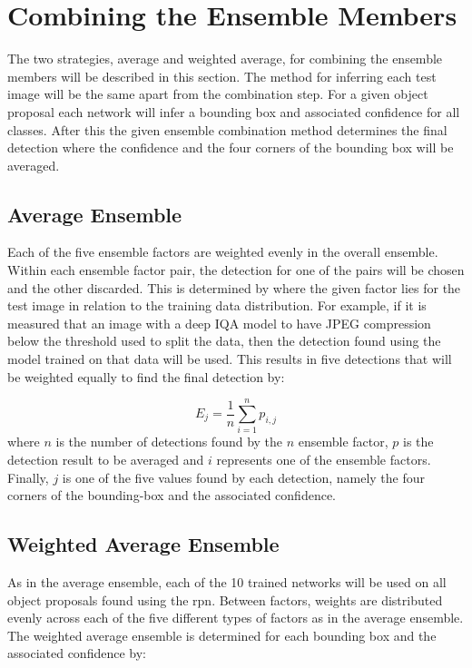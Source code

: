 \documentclass[a4paper,twoside]{article}
\begin{document}
\section{Combining the Ensemble Members}
The two strategies, average and weighted average, for combining the ensemble members will be described in this section. The method for inferring each test image will be the same apart from the combination step. For a given object proposal each network will infer a bounding box and associated confidence for all classes. After this the given ensemble combination method determines the final detection where the confidence and the four corners of the bounding box will be averaged. 

\subsection{Average Ensemble}
Each of the five ensemble factors are weighted evenly in the overall ensemble. Within each ensemble factor pair, the detection for one of the pairs will be chosen and the other discarded. This is determined by where the given factor lies for the test image in relation to the training data distribution. For example, if it is measured that an image with a deep IQA model to have JPEG compression below the threshold used to split the data, then the detection found using the model trained on that data will be used. This results in five detections that will be weighted equally to find the final detection by:

\begin{equation}
  E_{j} = \frac{1}{n} \sum_{i=1}^{n} p_{i,j} 
\end{equation}
where $n$ is the number of detections found by the $n$ ensemble factor, $p$ is the detection result to be averaged and $i$ represents one of the ensemble factors. Finally, $j$ is one of the five values found by each detection, namely the four corners of the bounding-box and the associated confidence.


\subsection{Weighted Average Ensemble}
As in the average ensemble, each of the 10 trained networks will be used on all object proposals found using the \gls{rpn}. Between factors, weights are distributed evenly across each of the five different types of factors as in the average ensemble. The weighted average ensemble is determined for each bounding box and the associated confidence by:
\end{document}
